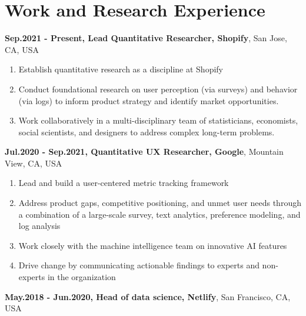 \documentclass[11pt,]{article}
\providecommand{\tightlist}{%
  \setlength{\itemsep}{0pt}\setlength{\parskip}{0pt}}
\renewenvironment{itemize}{
  \begin{list}{}{
    \setlength{\leftmargin}{1.5em}
  }
}{
  \end{list}
}
\begin{document}
\hypertarget{work-and-research-experience}{%
\section{Work and Research
Experience}\label{work-and-research-experience}}

\begin{itemize}
\item
  \textbf{Sep.2021 - Present, Lead Quantitative Researcher, Shopify},
  San Jose, CA, USA

  \begin{enumerate}
  \def\labelenumi{\arabic{enumi}.}
  \tightlist
  \item
    Establish quantitative research as a discipline at Shopify
  \item
    Conduct foundational research on user perception (via surveys) and
    behavior (via logs) to inform product strategy and identify market
    opportunities.
  \item
    Work collaboratively in a multi-disciplinary team of statisticians,
    economists, social scientists, and designers to address complex
    long-term problems.
  \end{enumerate}
\item
  \textbf{Jul.2020 - Sep.2021, Quantitative UX Researcher, Google},
  Mountain View, CA, USA

  \begin{enumerate}
  \def\labelenumi{\arabic{enumi}.}
  \tightlist
  \item
    Lead and build a user-centered metric tracking framework
  \item
    Address product gaps, competitive positioning, and unmet user needs
    through a combination of a large-scale survey, text analytics,
    preference modeling, and log analysis
  \item
    Work closely with the machine intelligence team on innovative AI
    features
  \item
    Drive change by communicating actionable findings to experts and
    non-experts in the organization
  \end{enumerate}
\item
  \textbf{May.2018 - Jun.2020, Head of data science, Netlify}, San
  Francisco, CA, USA


\end{itemize}
\end{document}

